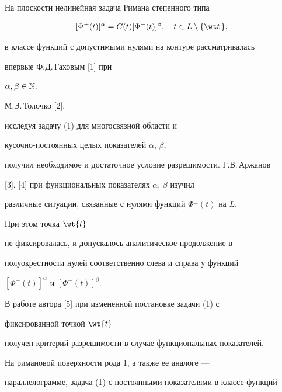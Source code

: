 

\maketitle


\label{begin}








На плоскости нелинейная задача Римана степенного типа


\begin{equation}


[\Phi^+(t)]^{\alpha}= G(t)[\Phi^-(t)]^{\beta},\quad


t\in L\setminus\{\wt t\, \},


\end{equation}


в классе функций с допустимыми нулями на контуре рассматривалась


впервые Ф.Д.\,Гаховым [1] при


$\alpha, \beta \in \Bbb N$.


М.Э.\,Толочко [2],


исследуя задачу (1) для многосвязной области и


кусочно-постоянных целых показателей $\alpha$, $\beta$,


получил необходимое и достаточное условие разрешимости. Г.В.\,Аржанов 


[3], [4] при функциональных показателях $\alpha$, $\beta$ изучил


различные ситуации, связанные с нулями функций $\Phi^{\pm}(t)$ на $L$.


При этом точка $\wt{t}$


не фиксировалась, и допускалось аналитическое продолжение в


полуокрестности нулей соответственно слева и справа у функций


$[\Phi^+(t)]^{\alpha}$ и $ [\Phi^-(t)]^{\beta}$.


В работе автора [5] при измененной постановке задачи (1) с


фиксированной точкой $\wt{t}$


получен критерий разрешимости в случае функциональных показателей.


На римановой поверхности рода 1, а также ее аналоге ---


параллелограмме, задача (1) с постоянными показателями в классе функций


